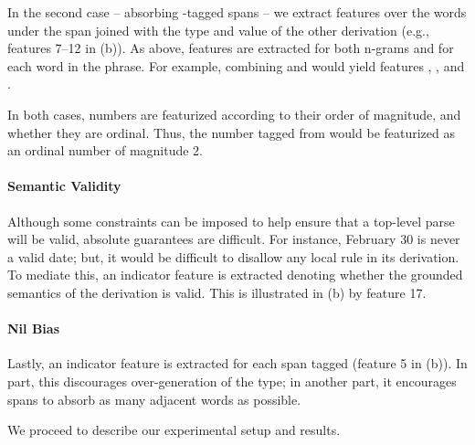 In the second case -- absorbing -tagged spans --
  we extract features over the words under the  span joined with
  the type and value of the other derivation
  (e.g., features 7--12 in  (b)).
As above, features are extracted for both n-grams and for each word in
  the phrase.
For example, combining  and  would yield features
  ,
  , and
  .

In both cases, numbers are featurized according to their order of magnitude,
  and whether they are ordinal.
Thus, the number tagged from  would be featurized as an
  ordinal number of magnitude 2.

\paragraph{Semantic Validity}
Although some constraints can be imposed to help ensure that a top-level parse
  will be valid, absolute guarantees are difficult.
For instance, February 30 is never a valid date; but, it would be difficult
  to disallow any local rule in its derivation.
To mediate this, an indicator feature is extracted
  denoting whether the grounded semantics of the derivation is
  valid.
This is illustrated in  (b) by feature 17.

\paragraph{Nil Bias}
Lastly, an indicator feature is extracted for each  span tagged
  (feature 5 in  (b)).
In part, this discourages over-generation of the type; in another part,
  it encourages  spans to absorb as many adjacent words as possible.


We proceed to describe our experimental setup and results.
